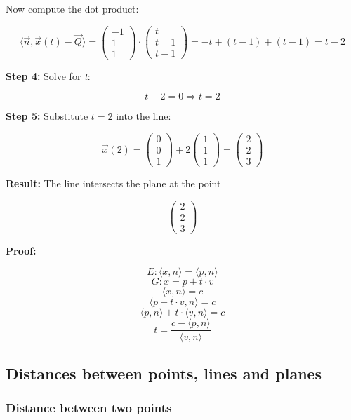 Now compute the dot product:

\[
	\langle \vec{n}, \vec{x}(t) - \vec{Q} \rangle =
	\begin{pmatrix} -1 \\ 1 \\ 1 \end{pmatrix} \cdot \begin{pmatrix} t \\ t - 1 \\ t - 1 \end{pmatrix}
	= -t + (t - 1) + (t - 1) = t - 2
\]

\textbf{Step 4:} Solve for \emph{t}:

\[
	t - 2 = 0 \Rightarrow t = 2
\]

\textbf{Step 5:} Substitute \( t = 2 \) into the line:

\[
	\vec{x}(2) = \begin{pmatrix} 0 \\ 0 \\ 1 \end{pmatrix} + 2 \begin{pmatrix} 1 \\ 1 \\ 1 \end{pmatrix} =
	\begin{pmatrix} 2 \\ 2 \\ 3 \end{pmatrix}
\]

\textbf{Result:} The line intersects the plane at the point

\[
	\boxed{\begin{pmatrix} 2 \\ 2 \\ 3 \end{pmatrix}}
\]

\textbf{Proof:}

\[
	E: \langle x, n\rangle = \langle p, n \rangle
\]
\[
	G: x = p + t \cdot v
\]
\[
	\langle x, n \rangle = c
\]
\[
	\langle p + t \cdot v, n \rangle = c
\]
\[
	\langle p, n \rangle + t \cdot \langle v, n \rangle = c
\]
\[
	t = \frac{c - \langle p, n \rangle}{\langle v, n \rangle}
\]
\QED

\subsection{Distances between points, lines and planes}

\subsubsection{Distance between two points}

